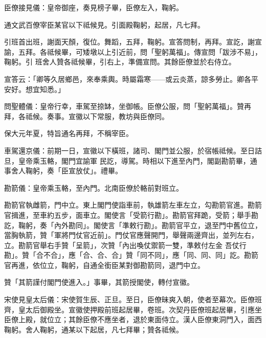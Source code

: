 \begin{pinyinscope}
 臣僚接見儀：皇帝御座，奏見榜子畢，臣僚左入，鞠躬。



 通文武百僚宰臣某官以下祗候見。引面殿鞠躬，起居，凡七拜。



 引班首出班，謝面天顏，復位。舞蹈，五拜，鞠躬。宣答問制，再拜。宣訖，謝宣諭，五拜。各祗候畢，可矮墩以上引近前，問「聖躬萬福」。傳宣問「跋涉不易」，鞠躬。引
 班舍人贊各祗候畢，引右上，準備宣問。其餘臣僚並於右侍立。



 宣答云：「卿等久居鄉邑，來奉乘輿。時屬霜寒——或云炎蒸，諒多勞止。卿各平安好。想宜知悉。」



 問聖體儀：皇帝行幸，車駕至捺缽，坐御帳。臣僚公服，問「聖躬萬福」。贊再拜，各祗候。奏事。宣徽以下常服，教坊與臣僚同。



 保大元年夏，特旨通名再拜，不稱宰臣。



 車駕還京儀：前期一日，宣徽以下橫班，諸司、閣門並公服，於宿帳祗候。至日詰旦，皇帝乘玉輅，閣門宜諭軍
 民訖，導駕。時相以下進至內門，閣副勘箭畢，通事舍人鞠躬，奏「臣宣放仗」。禮畢。



 勘箭儀：皇帝乘玉輅，至內門。北南臣僚於輅前對班立。



 勘箭官執雌箭，門中立。東上閣門使詣車前，執雄箭左車左立，勾勘箭官進。勘箭官揖進，至車約五步，面車立。閣使言「受箭行勘」。勘箭官拜跪，受箭；舉手勘訖，鞠躬，奏「內外勘同」。閣使言「準敕行勘」。勘箭官平立，退至門中舊位立，當胸執箭，贊「軍將門仗官近前」。門仗官應聲開門，舉聲兩邊齊出，並列左右，立。勘箭官舉右手贊「呈箭」，次贊「內出喚仗禦箭一雙，準敕付左金
 吾仗行勘」。贊「合不合」，應「合、合、合」贊「同不同」，應「同、同、同」訖。勘箭官再進，依位立，鞠躬，自通全銜臣某對御勘箭同，退門中立。



 贊「其箭謹付閣門使進入。」事畢，其箭授閣使，轉付宣徽。



 宋使見皇太后儀：宋使賀生辰、正旦。至日，臣僚昧爽入朝，使者至幕次。臣僚班齊，皇太后御殿坐。宣徽使押殿前班起居畢，卷班。次契丹臣僚班起居畢，引應坐臣僚上殿，就位立；其餘臣僚不應坐者，退於東面侍立。漢人臣僚東洞門入，面西鞠躬。舍人鞠躬，通某以下起居，凡七拜畢；贊各祗候。




\end{pinyinscope}
